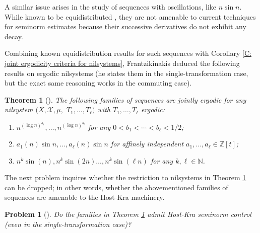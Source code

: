 \documentclass[11pt]{amsart}
\newtheorem{theorem}[lemma]{Theorem}
\newtheorem{problem}{Problem}
\theoremstyle{definition}
\newcommand{\N}{{\mathbb N}}
\newcommand{\Z}{{\mathbb Z}}
\newcommand{\CX}{{\mathcal X}}
\newcommand{\CY}{{\mathcal Y}}
\newcommand{\1}{{\mathbf{1}}}
\begin{document}
    A similar issue arises in the study of sequences with oscillations, like $n \sin n$. While known to be equidistributed \cite{BBK02, BBK95, BK90}, they are not amenable to current techniques for seminorm estimates because their successive derivatives do not exhibit any decay. 

    Combining known equidistribution results for such sequences with Corollary \ref{C: joint ergodicity criteria for nilsystems}, Frantzikinakis %
    deduced the following results on ergodic nilsystems (he states them in the single-transformation case, but the exact same reasoning works in the commuting case).
    \begin{theorem}[{\cite[Theorem 1.10]{Fr21}}]\label{T: Fr joint ergodicity for weird sequences}
        The following families of sequences are jointly ergodic for any nilsystem $(X, \CX, \mu,$\! $T_1, \ldots, T_\ell)$ with $T_1, \ldots, T_\ell$ ergodic: 
        \begin{enumerate}
            \item $n^{(\log n)^{b_1}}, \ldots, n^{(\log n)^{b_\ell}}$ for any $0<b_1<\cdots < b_\ell < 1/2$;
            \item $a_1(n)\sin n, \ldots, a_\ell(n) \sin n$ for affinely independent $a_1, \ldots, a_\ell\in\Z[t]$;
            \item $n^k\sin(n), n^k\sin(2n) \ldots, n^k \sin(\ell n)$ for any $k,\ell\in\N$.
        \end{enumerate}
    \end{theorem}

    The next problem inquires whether the restriction to nilsystems in Theorem \ref{T: Fr joint ergodicity for weird sequences} can be dropped; in other words, whether the abovementioned families of sequences are amenable to the Host-Kra machinery.
    \begin{problem}[{\cite[Problem 2]{Fr21}}]
        Do the families in Theorem \ref{T: Fr joint ergodicity for weird sequences} admit Host-Kra seminorm control (even in the single-transformation case)?
    \end{problem}
    
\end{document}
